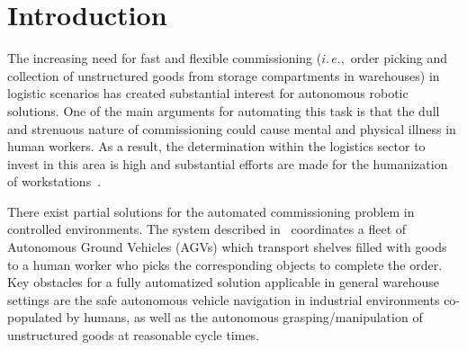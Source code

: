 \section{Introduction}
\label{sec:intro}
%
The increasing need for fast and flexible commissioning ($i.\,e.,$ order picking and collection of
unstructured goods from storage compartments in warehouses) in logistic scenarios has created
substantial interest for autonomous robotic solutions. One of the main arguments for automating this
task is that the dull and strenuous nature of commissioning could cause mental and physical illness
in human workers. As a result, the determination within the logistics sector to invest in this area
is high and substantial efforts are made for the humanization of workstations~\cite{Eche08}.

There exist partial solutions for the automated commissioning problem in controlled
environments. The system described in~\cite{Wurm08} coordinates a fleet of Autonomous Ground
Vehicles (AGVs) which transport shelves filled with goods to a human worker who picks the
corresponding objects to complete the order. Key obstacles for a fully automatized solution
applicable in general warehouse settings are the safe autonomous vehicle navigation in industrial
environments co-populated by humans, as well as the autonomous grasping/manipulation of unstructured
goods at reasonable cycle times.

